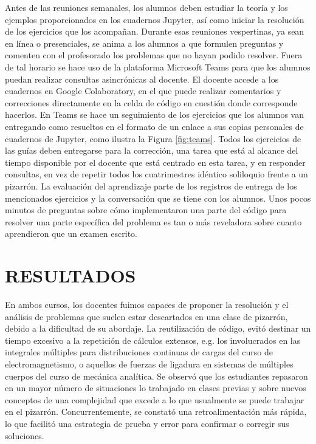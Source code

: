 \documentclass[a4paper]{fodami}        %
\begin{document}
Antes de las reuniones semanales, los alumnos deben estudiar la teoría y los ejemplos proporcionados en los cuadernos Jupyter, así como iniciar la resolución de los ejercicios que los acompañan.
Durante esas reuniones vespertinas, ya sean en línea o presenciales, se anima a los alumnos a que formulen preguntas y comenten con el profesorado los problemas que no hayan podido resolver.
Fuera de tal horario se hace uso de la plataforma Microsoft Teams para que los alumnos puedan realizar consultas asincrónicas al docente.
El docente accede a los cuadernos en Google Colaboratory, en el que puede realizar comentarios y correcciones directamente en la celda de código en cuestión donde corresponde hacerlos.
En Teams se hace un seguimiento de los ejercicios que los alumnos van entregando como resueltos en el formato de un enlace a sus copias personales de cuadernos de Jupyter, como ilustra la Figura \ref{fig:teams}.
Todos los ejercicios de las guías deben entregarse para la corrección, una tarea que está al alcance del tiempo disponible por el docente que está centrado en esta tarea, y en responder consultas, en vez de repetir todos los cuatrimestres idéntico soliloquio frente a un pizarrón.
La evaluación del aprendizaje parte de los registros de entrega de los mencionados ejercicios y la conversación que se tiene con los alumnos.
Unos pocos minutos de preguntas sobre cómo implementaron una parte del código para resolver una parte específica del problema es tan o más reveladora sobre cuanto aprendieron que un examen escrito.





\section{RESULTADOS}

En ambos cursos, los docentes fuimos capaces de proponer la resolución y el análisis de problemas que suelen estar descartados en una clase de pizarrón, debido a la dificultad de su abordaje.
La reutilización de código, evitó destinar un tiempo excesivo a la repetición de cálculos extensos, e.g. los involucrados en las integrales múltiples para distribuciones continuas de cargas del curso de electromagnetismo, o aquellos de fuerzas de ligadura en sistemas de múltiples cuerpos del curso de mecánica analítica.
Se observó que los estudiantes repasaron en un mayor número de situaciones lo trabajado en clases previas y sobre nuevos conceptos de una complejidad que excede a lo que usualmente se puede trabajar en el pizarrón.
Concurrentemente, se constató una retroalimentación más rápida, lo que facilitó una estrategia de prueba y error para confirmar o corregir sus soluciones.
\end{document}
